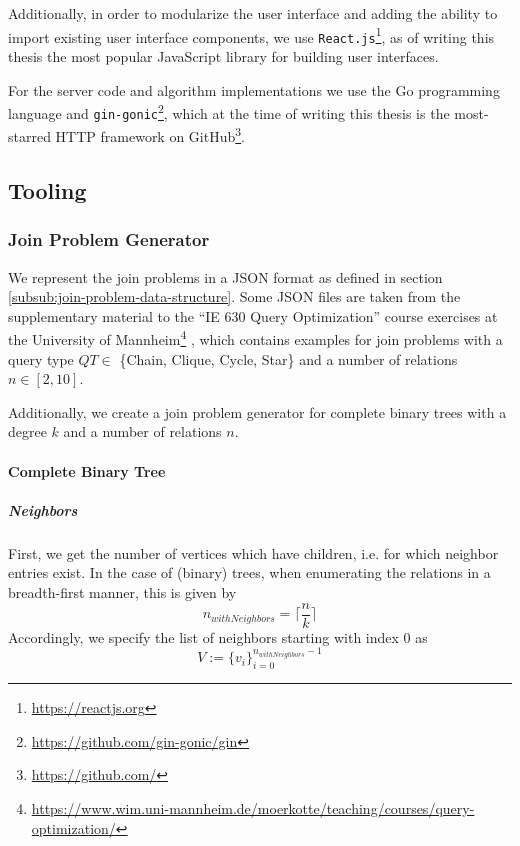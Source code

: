 Additionally, in order to modularize the user interface and adding the ability to import existing user interface components, we use \texttt{React.js}\footnote{\url{https://reactjs.org}}, as of writing this thesis the most popular JavaScript library for building user interfaces.

For the server code and algorithm implementations we use the Go programming language and \texttt{gin-gonic}\footnote{\url{https://github.com/gin-gonic/gin}}, which at the time of writing this thesis is the most-starred HTTP framework on GitHub\footnote{\url{https://github.com/}}.


\subsection{Tooling}

\subsubsection{Join Problem Generator}
We represent the join problems in a JSON format as defined in section \ref{subsub:join-problem-data-structure}. 
Some JSON files are taken from the supplementary material to the ``IE 630 Query Optimization'' course exercises at the University of Mannheim\footnote{\url{https://www.wim.uni-mannheim.de/moerkotte/teaching/courses/query-optimization/}}
, which contains examples for join problems with a query type $QT \in $ \{Chain, Clique, Cycle, Star\} and a number of relations $n \in [2,10]$.

Additionally, we create a join problem generator for complete binary trees with a degree $k$ and a number of relations $n$.

\paragraph{Complete Binary Tree}
\subparagraph{Neighbors}
First, we get the number of vertices which have children, i.e. for which neighbor entries exist.
In the case of (binary) trees, when enumerating the relations in a breadth-first manner, this is given by 
\begin{equation}
    n_{withNeighbors} = \lceil\frac{n}{k}\rceil
\end{equation}
Accordingly, we specify the list of neighbors starting with index 0 as
\begin{equation}
   V := \{v_i\}_{i=0}^{n_{withNeighbors}-1}
\end{equation} 

